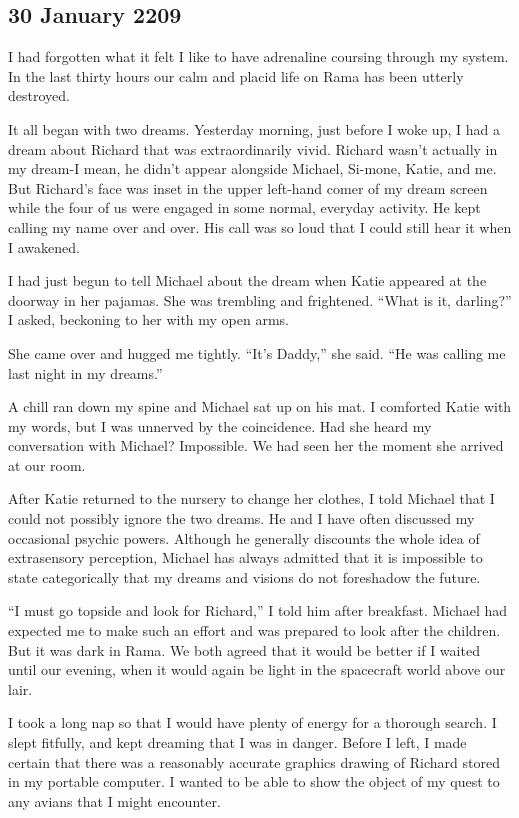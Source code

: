 \documentclass[]{article}
\begin{document}
\subsection*{30 January 2209}

I had forgotten what it felt I like to have adrenaline coursing through my system.  In the last thirty hours our calm and placid life on Rama has been utterly destroyed.

It all began with two dreams.  Yesterday morning, just before I woke up, I had a dream about Richard that was extraordinarily vivid.  Richard wasn’t actually in my dream-I mean, he didn’t appear alongside Michael, Si-mone, Katie, and me.  But Richard’s face was inset in the upper left-hand comer of my dream screen while the four of us were engaged in some normal, everyday activity.  He kept calling my name over and over.  His call was so loud that I could still hear it when I awakened.

I had just begun to tell Michael about the dream when Katie appeared at the doorway in her pajamas.  She was trembling and frightened.  “What is it, darling?” I asked, beckoning to her with my open arms.

She came over and hugged me tightly.  “It’s Daddy,” she said.  “He was calling me last night in my dreams.”

A chill ran down my spine and Michael sat up on his mat.  I comforted Katie with my words, but I was unnerved by the coincidence.  Had she heard my conversation with Michael? Impossible.  We had seen her the moment she arrived at our room.

After Katie returned to the nursery to change her clothes, I told Michael that I could not possibly ignore the two dreams.  He and I have often discussed my occasional psychic powers.  Although he generally discounts the whole idea of extrasensory perception, Michael has always admitted that it is impossible to state categorically that my dreams and visions do not foreshadow the future.

“I must go topside and look for Richard,” I told him after breakfast.  Michael had expected me to make such an effort and was prepared to look after the children.  But it was dark in Rama.  We both agreed that it would be better if I waited until our evening, when it would again be light in the spacecraft world above our lair.

I took a long nap so that I would have plenty of energy for a thorough search.  I slept fitfully, and kept dreaming that I was in danger.  Before I left, I made certain that there was a reasonably accurate graphics drawing of Richard stored in my portable computer.  I wanted to be able to show the object of my quest to any avians that I might encounter.
\end{document}
